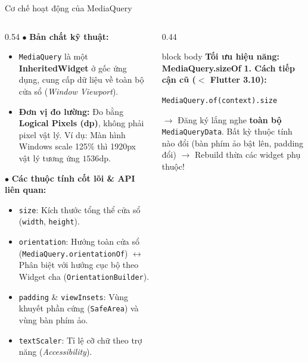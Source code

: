 \documentclass[aspectratio=169, 10pt]{beamer}
\begin{document}
\begin{frame}{Cơ chế hoạt động của MediaQuery}
  \vspace{-0.15cm}
  \begin{columns}[T]
    \begin{column}{0.54\textwidth}
      \footnotesize
      $\bullet$ \textbf{Bản chất kỹ thuật:}
      \begin{itemize}\setlength{\itemsep}{1.5pt}
        \item \texttt{MediaQuery} là một \textbf{InheritedWidget} ở gốc ứng dụng, cung cấp dữ liệu về toàn bộ cửa sổ (\textit{Window Viewport}).
        \item \textbf{Đơn vị đo lường:} Đo bằng \textbf{Logical Pixels (dp)}, không phải pixel vật lý. Ví dụ: Màn hình Windows scale 125\% thì 1920px vật lý tương ứng $1536\text{dp}$.
      \end{itemize}
      
      \vskip 0.08cm
      $\bullet$ \textbf{Các thuộc tính cốt lõi \& API liên quan:}
      \begin{itemize}\setlength{\itemsep}{1.5pt}
        \item \texttt{size}: Kích thước tổng thể cửa sổ (\texttt{width}, \texttt{height}).
        \item \texttt{orientation}: Hướng toàn cửa sổ (\texttt{MediaQuery.orientationOf}) $\longleftrightarrow$ Phân biệt với hướng cục bộ theo Widget cha (\texttt{OrientationBuilder}).
        \item \texttt{padding} \& \texttt{viewInsets}: Vùng khuyết phần cứng (\texttt{SafeArea}) và vùng bàn phím ảo.
        \item \texttt{textScaler}: Tỉ lệ cỡ chữ theo trợ năng (\textit{Accessibility}).
      \end{itemize}
    \end{column}

    \begin{column}{0.44\textwidth}
      \begin{beamercolorbox}[rounded=true, shadow=false, wd=\textwidth, sep=4pt]{block body}
        \textbf{\normalsize\color{blue!80!black}Tối ưu hiệu năng: MediaQuery.sizeOf}
        \vskip 0.08cm
        \footnotesize
        \textbf{1. Cách tiếp cận cũ ($<$ Flutter 3.10):}
        \begin{center}
          \texttt{MediaQuery.of(context).size}
        \end{center}
        $\rightarrow$ Đăng ký lắng nghe \textbf{toàn bộ} \texttt{MediaQueryData}. Bất kỳ thuộc tính nào đổi (bàn phím ảo bật lên, padding đổi) $\rightarrow$ Rebuild thừa các widget phụ thuộc!
        

\end{beamercolorbox}
\end{column}
\end{columns}
\end{frame}
\end{document}

